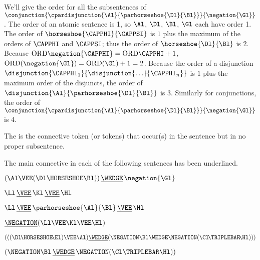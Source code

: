 \begin{majorILnc}{}
We'll give the order for all the subsentences of $\conjunction{\cpardisjunction{\Al}{\parhorseshoe{\Dl}{\Bl}}}{\negation{\Gl}}$.
The order of an atomic sentence is 1, so $\Al$, $\Dl$, $\Bl$, $\Gl$ each have order 1.
The order of $\horseshoe{\CAPPHI}{\CAPPSI}$ is $1$ plus the maximum of the orders of $\CAPPHI$ and $\CAPPSI$; thus the order of $\horseshoe{\Dl}{\Bl}$ is 2.  
Because $\ORD{\negation{\CAPPHI}}=\ORD{\CAPPHI}+1$, $\ORD{(\negation{\Gl})}=\ORD{(\Gl)}+1=2$. 
Because the order of a disjunction $\disjunction{\CAPPHI_\integer{1}}{\disjunction{\ldots}{\CAPPHI_{\integer{n}}}}$ is $1$ plus the maximum order of the disjuncts, the order of $\disjunction{\Al}{\parhorseshoe{\Dl}{\Bl}}$ is 3.
Similarly for conjunctions, the order of $\conjunction{\cpardisjunction{\Al}{\parhorseshoe{\Dl}{\Bl}}}{\negation{\Gl}}$ is 4.
\end{majorILnc}
\begin{majorILnc}{}
The  is the connective token (or tokens) that occur(s) in the sentence but in no proper subsentence.  
\end{majorILnc}
\begin{majorILnc}{}
The main connective in each of the following sentences has been underlined.
\begin{multicols}{2}
\begin{cenumerate}
\item $(\Al\VEE(\Dl\HORSESHOE\Bl))\, \underline{\WEDGE}\, \negation{\Gl}$
\item $\Ll\, \underline{\VEE}\, \Kl\, \underline{\VEE}\, \Hl $
\item $\Ll\, \underline{\VEE}\, \parhorseshoe{\Al}{\Bl}\, \underline{\VEE}\, \Hl $
\item $\underline{\NEGATION}(\Ll\VEE\Kl\VEE\Hl)$
\item $(((\Dl\!\HORSESHOE\!\El)\VEE\Al)\underline{\WEDGE}(\NEGATION\Bl\WEDGE\NEGATION(\Cl\!\TRIPLEBAR\!\Hl)))$
\item $(\NEGATION\Bl\, \underline{\WEDGE}\, \NEGATION(\Cl\TRIPLEBAR\Hl))$
\end{cenumerate}
\end{multicols}
\end{majorILnc}

